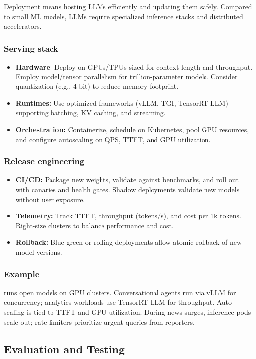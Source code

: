 Deployment means hosting LLMs efficiently and updating them safely. Compared to small ML models, LLMs require specialized inference stacks and distributed accelerators.

\subsubsection{Serving stack}
\begin{itemize}
    \item \textbf{Hardware:} Deploy on GPUs/TPUs sized for context length and throughput. Employ model/tensor parallelism for trillion-parameter models. Consider quantization (e.g., 4-bit) to reduce memory footprint.
    \item \textbf{Runtimes:} Use optimized frameworks (vLLM, TGI, TensorRT-LLM) supporting batching, KV caching, and streaming.
    \item \textbf{Orchestration:} Containerize, schedule on Kubernetes, pool GPU resources, and configure autoscaling on QPS, TTFT, and GPU utilization.
\end{itemize}

\subsubsection{Release engineering}
\begin{itemize}
    \item \textbf{CI/CD:} Package new weights, validate against benchmarks, and roll out with canaries and health gates. Shadow deployments validate new models without user exposure.
    \item \textbf{Telemetry:} Track TTFT, throughput (tokens/s), and cost per 1k tokens. Right-size clusters to balance performance and cost.
    \item \textbf{Rollback:} Blue-green or rolling deployments allow atomic rollback of new model versions.
\end{itemize}

\subsubsection{Example}
\ishtar{} runs open models on GPU clusters. Conversational agents run via vLLM for concurrency; analytics workloads use TensorRT-LLM for throughput. Auto-scaling is tied to TTFT and GPU utilization. During news surges, inference pods scale out; rate limiters prioritize urgent queries from reporters.  

\subsection{Evaluation and Testing}
\label{subsec:evaluation}

